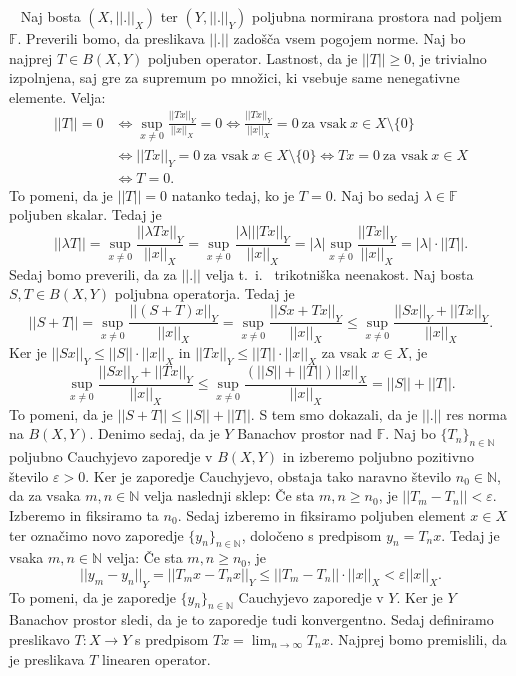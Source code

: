 \documentclass[12pt,a4paper,oneside,fleqn,openany]{book}
\newcommand{\eopf}{\raisebox{0.8ex}{\framebox{}}} %
\newenvironment{dokaz}%
{\noindent{\bf Dokaz.}\ }%
{\hfill\eopf\par\bigskip}%
\newcommand{\F}{\mathbb{F}}
\newcommand{\N}{\mathbb{N}}
\newcommand{\abs}[1]{\ensuremath{\lvert #1 \rvert}}
\newcommand{\norm}[1]{\abs{\abs{#1}}}
\newcommand{\map}[3]{\ensuremath{{#1}:{#2}\rightarrow{#3}}}
\begin{document}
\begin{dokaz}
	Naj bosta $(X, \norm{.}_X)$ ter $(Y, \norm{.}_Y)$ poljubna normirana prostora nad poljem $\F$. Preverili bomo, da preslikava $\norm{.}$ zadošča vsem pogojem norme. Naj bo najprej $T\in B(X, Y)$ poljuben operator. Lastnost, da je $\norm{T}\geq 0$, je trivialno izpolnjena, saj gre za supremum po množici, ki vsebuje same nenegativne elemente.
	Velja: \begin{align*}
		\norm{T}=0 &\iff \sup_{x\neq 0}\frac{\norm{Tx}_Y}{\norm{x}_X} = 0 \iff \frac{\norm{Tx}_Y}{\norm{x}_X}=0~\text{za vsak}~x\in X\setminus\{0\} \\
		&\iff \norm{Tx}_Y=0~\text{za vsak}~x\in X\setminus\{0\} \iff Tx = 0~\text{za vsak}~x\in X\\
		&\iff T=0.
	\end{align*} To pomeni, da je $\norm{T}=0$ natanko tedaj, ko je $T=0$.
	Naj bo sedaj $\lambda\in \F$ poljuben skalar. Tedaj je $$\norm{\lambda T}= \sup_{x\neq 0}\frac{\norm{\lambda Tx}_Y}{\norm{x}_X}=\sup_{x\neq 0}\frac{\abs{\lambda}\norm{Tx}_Y}{\norm{x}_X}=\abs{\lambda}\sup_{x\neq 0}\frac{\norm{Tx}_Y}{\norm{x}_X}=\abs{\lambda}\cdot\norm{T}.$$
	Sedaj bomo preverili, da za $\norm{.}$ velja t.~i.~ trikotniška neenakost. Naj bosta $S, T\in B(X, Y)$ poljubna operatorja. Tedaj je $$\norm{S+T}= \sup_{x\neq 0}\frac{\norm{(S+T)x}_Y}{\norm{x}_X}=\sup_{x\neq 0}\frac{\norm{Sx+Tx}_Y}{\norm{x}_X}\leq \sup_{x\neq 0}\frac{\norm{Sx}_Y+\norm{Tx}_Y}{\norm{x}_X}.$$ Ker je $\norm{Sx}_Y \leq \norm{S}\cdot\norm{x}_X$ in $\norm{Tx}_Y \leq \norm{T}\cdot\norm{x}_X$ za vsak $x\in X$, je $$\sup_{x\neq 0}\frac{\norm{Sx}_Y+\norm{Tx}_Y}{\norm{x}_X}\leq \sup_{x\neq 0}\frac{(\norm{S}+\norm{T})\norm{x}_X}{\norm{x}_X}= \norm{S}+\norm{T}.$$ To pomeni, da je $\norm{S+T}\leq \norm{S} + \norm{T}$. S tem smo dokazali, da je $\norm{.}$ res norma na $B(X, Y)$. Denimo sedaj, da je $Y$ Banachov prostor nad $\F$. Naj bo $\{T_n\}_{n\in\N}$ poljubno Cauchyjevo zaporedje v $B(X, Y)$ in izberemo poljubno pozitivno število $\varepsilon>0$. Ker je zaporedje Cauchyjevo, obstaja tako naravno število $n_0\in\N$, da za vsaka $m, n\in \N$ velja naslednji sklep: Če sta $m, n\geq n_0$, je $\norm{T_m - T_n}<\varepsilon$. Izberemo in fiksiramo ta $n_0$. Sedaj izberemo in fiksiramo poljuben element $x\in X$ ter označimo novo zaporedje $\{y_n\}_{n\in\N}$, določeno s predpisom $y_n = T_nx$. Tedaj je vsaka $m,n \in \N$ velja: Če sta $m, n\geq n_0$, je $$\norm{y_m - y_n}_Y = \norm{T_mx - T_nx}_Y \leq \norm{T_m - T_n}\cdot\norm{x}_X<\varepsilon\norm{x}_X.$$ To pomeni, da je zaporedje $\{y_n\}_{n\in\N}$ Cauchyjevo zaporedje v $Y$. Ker je $Y$ Banachov prostor sledi, da je to zaporedje tudi konvergentno. Sedaj definiramo preslikavo $\map{T}{X}{Y}$ s predpisom $Tx = \lim_{n\to\infty}T_nx$. Najprej bomo premislili, da je preslikava $T$ linearen operator.

\end{dokaz}
\end{document}
